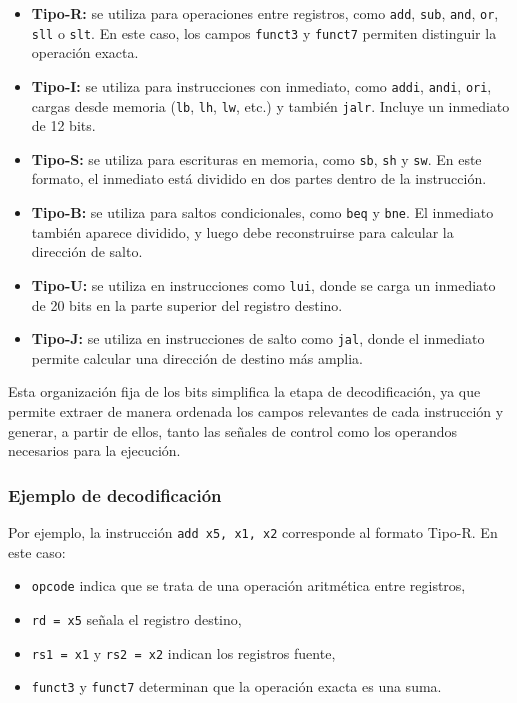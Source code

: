 \begin{itemize}
    \item \textbf{Tipo-R:} se utiliza para operaciones entre registros, como \texttt{add}, \texttt{sub}, \texttt{and}, \texttt{or}, \texttt{sll} o \texttt{slt}. En este caso, los campos \texttt{funct3} y \texttt{funct7} permiten distinguir la operación exacta.
    
    \item \textbf{Tipo-I:} se utiliza para instrucciones con inmediato, como \texttt{addi}, \texttt{andi}, \texttt{ori}, cargas desde memoria (\texttt{lb}, \texttt{lh}, \texttt{lw}, etc.) y también \texttt{jalr}. Incluye un inmediato de 12 bits.
    
    \item \textbf{Tipo-S:} se utiliza para escrituras en memoria, como \texttt{sb}, \texttt{sh} y \texttt{sw}. En este formato, el inmediato está dividido en dos partes dentro de la instrucción.
    
    \item \textbf{Tipo-B:} se utiliza para saltos condicionales, como \texttt{beq} y \texttt{bne}. El inmediato también aparece dividido, y luego debe reconstruirse para calcular la dirección de salto.
    
    \item \textbf{Tipo-U:} se utiliza en instrucciones como \texttt{lui}, donde se carga un inmediato de 20 bits en la parte superior del registro destino.
    
    \item \textbf{Tipo-J:} se utiliza en instrucciones de salto como \texttt{jal}, donde el inmediato permite calcular una dirección de destino más amplia.
\end{itemize}

Esta organización fija de los bits simplifica la etapa de decodificación, ya que permite extraer de manera ordenada los campos relevantes de cada instrucción y generar, a partir de ellos, tanto las señales de control como los operandos necesarios para la ejecución.

\subsubsection{Ejemplo de decodificación}
Por ejemplo, la instrucción \texttt{add x5, x1, x2} corresponde al formato Tipo-R. En este caso:
\begin{itemize}
    \item \texttt{opcode} indica que se trata de una operación aritmética entre registros,
    \item \texttt{rd = x5} señala el registro destino,
    \item \texttt{rs1 = x1} y \texttt{rs2 = x2} indican los registros fuente,
    \item \texttt{funct3} y \texttt{funct7} determinan que la operación exacta es una suma.
\end{itemize}

